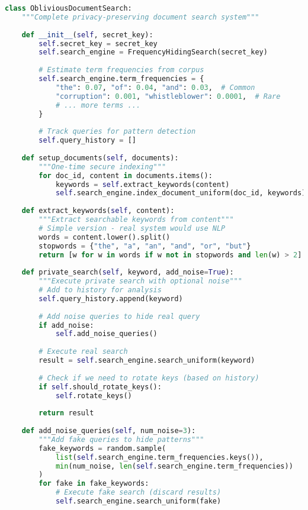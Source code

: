 \begin{lstlisting}[language=Python, caption=Complete oblivious document search]
class ObliviousDocumentSearch:
    """Complete privacy-preserving document search system"""
    
    def __init__(self, secret_key):
        self.secret_key = secret_key
        self.search_engine = FrequencyHidingSearch(secret_key)
        
        # Estimate term frequencies from corpus
        self.search_engine.term_frequencies = {
            "the": 0.07, "of": 0.04, "and": 0.03,  # Common
            "corruption": 0.001, "whistleblower": 0.0001,  # Rare
            # ... more terms ...
        }
        
        # Track queries for pattern detection
        self.query_history = []
        
    def setup_documents(self, documents):
        """One-time secure indexing"""
        for doc_id, content in documents.items():
            keywords = self.extract_keywords(content)
            self.search_engine.index_document_uniform(doc_id, keywords)
    
    def extract_keywords(self, content):
        """Extract searchable keywords from content"""
        # Simple version - real system would use NLP
        words = content.lower().split()
        stopwords = {"the", "a", "an", "and", "or", "but"}
        return [w for w in words if w not in stopwords and len(w) > 2]
    
    def private_search(self, keyword, add_noise=True):
        """Execute private search with optional noise"""
        # Add to history for analysis
        self.query_history.append(keyword)
        
        # Add noise queries to hide real query
        if add_noise:
            self.add_noise_queries()
        
        # Execute real search
        result = self.search_engine.search_uniform(keyword)
        
        # Check if we need to rotate keys (based on history)
        if self.should_rotate_keys():
            self.rotate_keys()
        
        return result
    
    def add_noise_queries(self, num_noise=3):
        """Add fake queries to hide patterns"""
        fake_keywords = random.sample(
            list(self.search_engine.term_frequencies.keys()),
            min(num_noise, len(self.search_engine.term_frequencies))
        )
        for fake in fake_keywords:
            # Execute fake search (discard results)
            self.search_engine.search_uniform(fake)
    

\end{lstlisting}
